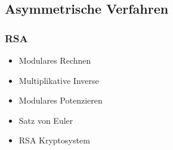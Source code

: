 \documentclass[a4paper,12pt]{article}
\begin{document}
\subsection{Asymmetrische Verfahren}
\subsubsection{RSA}
\begin{itemize}
    \item Modulares Rechnen
    \item Multiplikative Inverse
    \item Modulares Potenzieren
    \item Satz von Euler
    \item RSA Kryptosystem
\end{itemize}
\end{document}
